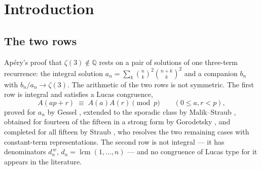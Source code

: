 \documentclass[11pt,reqno]{amsart}
\theoremstyle{plain}
\theoremstyle{definition}
\theoremstyle{remark}
\newcommand{\Q}{\mathbb{Q}}
\newcommand{\bin}[2]{\binom{#1}{#2}}
\DeclareMathOperator{\lcm}{lcm}
\numberwithin{equation}{section}
\begin{document}
\begin{abstract}
finite-certificate proofs, valid for every $n$, of the symmetric closed forms for the Franel
numbers and for $\sum_k\bin nk^4$ --- these sums are the $t^2$-coefficients of
Straub--Zudilin's deformation, and we say so, together with an elementary re-derivation of
the Ap\'ery limits $\zeta(2)/4$ and $\zeta(2)/5$ that they proved for all exponents; a proof
that the mechanism behind those two \emph{cannot} close the $\zeta(2)$-Ap\'ery case; and a
$\chi_{-4}$-twisted closed form for the Catalan-constant family $\mathbf E$. Three of the fifteen have no archimedean
Ap\'ery limit at all and satisfy the $p$-adic law regardless: the descent is a statement
about Frobenius. We locate the law precisely against Beukers--Vlasenko's Conjecture 7.5:
the two are the two rows of one $2\times2$ Frobenius matrix, neither implies the other, and
the character is invisible in unit-root formulations.
\end{abstract}

\maketitle

\section{Introduction}

\subsection{The two rows}
Ap\'ery's proof that $\zeta(3)\notin\Q$ rests on a pair of solutions of one three-term
recurrence: the integral solution $a_n=\sum_k\bin nk^2\bin{n+k}k^2$ and a companion $b_n$
with $b_n/a_n\to\zeta(3)$. The arithmetic of the two rows is not symmetric. The first row
is integral and satisfies a Lucas congruence,
\begin{equation}\label{eq:Arow}
  A(ap+r)\;\equiv\;A(a)A(r)\pmod p\qquad(0\le a,r<p),
\end{equation}
proved for $a_n$ by Gessel \cite{Gessel1982}, extended to the sporadic class by
Malik--Straub \cite{MalikStraub}, obtained for fourteen of the fifteen in a strong form by
Gorodetsky \cite{Gorodetsky}, and completed for all fifteen by Straub \cite{Straub2301},
who resolves the two remaining cases with constant-term representations. The second row is not integral --- it has denominators
$d_n^{\,w}$, $d_n=\lcm(1,\dots,n)$ --- and no congruence of Lucas type for it appears in
the literature.
\end{document}
